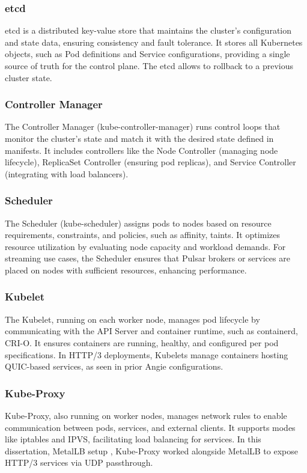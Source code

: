 \subsubsection{etcd}
etcd is a distributed key-value store that maintains the cluster's configuration and state data, ensuring consistency and fault tolerance. It stores all Kubernetes objects, such as Pod definitions and Service configurations, providing a single source of truth for the control plane. The etcd allows to rollback to a previous cluster state.

\subsubsection{Controller Manager}
The Controller Manager (kube-controller-manager) runs control loops that monitor the cluster's state and match it with the desired state defined in manifests. It includes controllers like the Node Controller (managing node lifecycle), ReplicaSet Controller (ensuring pod replicas), and Service Controller (integrating with load balancers). 

\subsubsection{Scheduler}
The Scheduler (kube-scheduler) assigns pods to nodes based on resource requirements, constraints, and policies, such as affinity, taints. It optimizes resource utilization by evaluating node capacity and workload demands. For streaming use cases, the Scheduler ensures that Pulsar brokers or services are placed on nodes with sufficient resources, enhancing performance.

\subsubsection{Kubelet}
The Kubelet, running on each worker node, manages pod lifecycle by communicating with the API Server and container runtime, such as containerd, CRI-O. It ensures containers are running, healthy, and configured per pod specifications. In HTTP/3 deployments, Kubelets manage containers hosting QUIC-based services, as seen in prior Angie configurations.

\subsubsection{Kube-Proxy}
Kube-Proxy, also running on worker nodes, manages network rules to enable communication between pods, services, and external clients. It supports modes like iptables and IPVS, facilitating load balancing for services. In this dissertation, MetalLB setup \cite{metallb-docs}, Kube-Proxy worked alongside MetalLB to expose HTTP/3 services via UDP passthrough.


